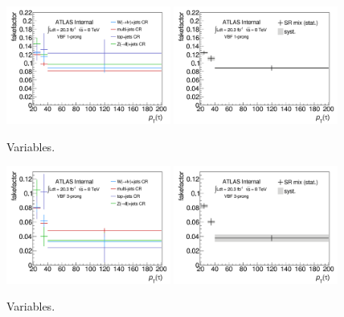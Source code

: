 \begin{figure}[tp]
  \centering
  \includegraphics[width=0.48\textwidth]{figures/backgrounds/fakefactor_8TeV_vbf_1p_CRs}
  \includegraphics[width=0.48\textwidth]{figures/backgrounds/fakefactor_8TeV_vbf_1p_mix}
  \caption{Variables.}
  \label{fig:backgrounds-fakefactorsVBF1p}
\end{figure}

\begin{figure}[tp]
  \centering
  \includegraphics[width=0.48\textwidth]{figures/backgrounds/fakefactor_8TeV_vbf_3p_CRs}
  \includegraphics[width=0.48\textwidth]{figures/backgrounds/fakefactor_8TeV_vbf_3p_mix}
  \caption{Variables.}
  \label{fig:backgrounds-fakefactorsVBF3p}
\end{figure}

